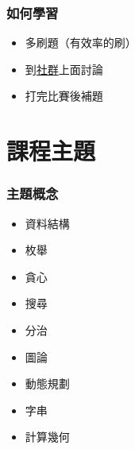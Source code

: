 \documentclass[mathserif]{beamer}
\begin{document}
\begin{frame}
    \frametitle{如何學習}
    \begin{itemize}
        \item 多刷題（有效率的刷）
        \item 到\href{https://discord.gg/cisc}{社群}上面討論
        \item 打完比賽後補題
    \end{itemize}
\end{frame}

\section{課程主題}

\begin{frame}
    \frametitle{主題概念}
    \begin{itemize}
        \item 資料結構
        \item 枚舉
        \item 貪心
        \item 搜尋
        \item 分治
        \item 圖論
        \item 動態規劃
        \item 字串
        \item 計算幾何
    \end{itemize}
\end{frame}
\end{document}
